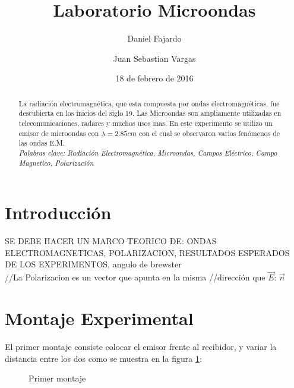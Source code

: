 \documentclass[aps,prl,reprint]{revtex4-1}
\begin{document}
\title{Laboratorio Microondas}

\author{Daniel Fajardo}
\author{Juan Sebastian Vargas}
 

\date{18 de febrero de 2016}

\setlength{\columnsep}{1cm}





\begin{abstract}
    
La radiación electromagnética, que esta compuesta por ondas electromagnéticas, fue descubierta en los inicios del siglo 19. Las Microondas son ampliamente utilizadas en telecomunicaciones, radares y muchos usos mas. En este experimento se utilizo un emisor de microondas con $\lambda= 2.85 cm$ con el cual se observaron varios fenómenos de las ondas E.M.\\
\textit{Palabras clave: Radiación Electromagn\'etica, Microondas, Campos El\'ectrico, Campo Magnetico, Polarización}


\end{abstract}
\maketitle

\section{Introducci\'on}
    SE DEBE HACER UN MARCO TEORICO DE:
    ONDAS ELECTROMAGNETICAS, POLARIZACION, RESULTADOS ESPERADOS DE LOS EXPERIMENTOS, angulo de brewster \\
//La Polarizacion es un vector que apunta en la misma //dirección que  $\vec{E}$: $\vec{n}$

\section{Montaje Experimental}

El primer montaje consiste colocar el emisor frente al recibidor, y variar la distancia entre los dos como se muestra en la figura \ref{monta1}:\\
\begin{figure}[H]
\begin{center}
 \caption{Primer montaje}
 \label{monta1}
 \end{center}
\end{figure}
\end{document}
